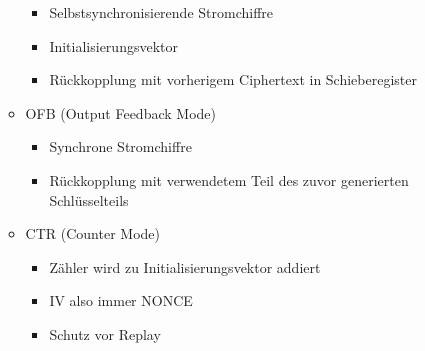 \documentclass[11pt, paper=a4, twocolumn]{scrartcl}
\begin{document}
\begin{itemize}
\begin{itemize}
						\begin{itemize}
							\item Selbstsynchronisierende Stromchiffre
							\item Initialisierungsvektor
							\item Rückkopplung mit vorherigem Ciphertext in Schieberegister
						\end{itemize}
					\item OFB (Output Feedback Mode)
						\begin{itemize}
							\item Synchrone Stromchiffre
							\item Rückkopplung mit verwendetem Teil des zuvor generierten Schlüsselteils
						\end{itemize}
					\item CTR (Counter Mode)
						\begin{itemize}
							\item Zähler wird zu Initialisierungsvektor addiert
							\item IV also immer NONCE
							\item Schutz vor Replay
						\end{itemize}
				\end{itemize}
		\end{itemize}
	
\end{document}
